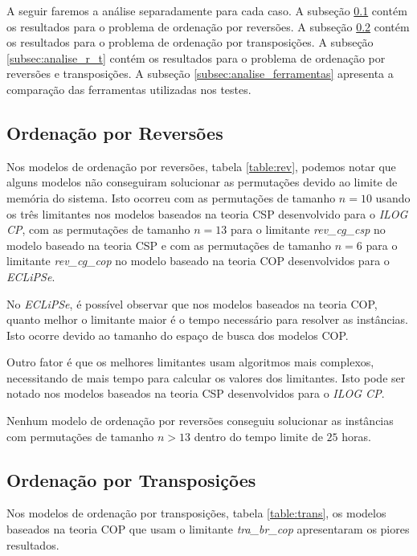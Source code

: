 A seguir faremos a análise separadamente para cada caso. A
subseção \ref{subsec:analise_rev} contém os resultados para o
problema de ordenação por reversões. A
subseção \ref{subsec:analise_tra} contém os resultados para o
problema de ordenação por transposições. A
subseção \ref{subsec:analise_r_t} contém os resultados para o
problema de ordenação por reversões e transposições. A
subseção \ref{subsec:analise_ferramentas} apresenta a comparação das
ferramentas utilizadas nos testes.

\subsection{Ordenação por Reversões}
\label{subsec:analise_rev}
Nos modelos de ordenação por reversões, tabela \ref{table:rev},
podemos notar que alguns modelos não conseguiram solucionar as
permutações devido ao limite de memória do sistema. Isto ocorreu com
as permutações de tamanho $n = 10$ usando os três limitantes nos
modelos baseados na teoria CSP desenvolvido para o \textit{ILOG CP},
com as permutações de tamanho $n = 13$ para o
limitante \textit{rev\_cg\_csp} no modelo baseado na teoria CSP e com
as permutações de tamanho $n = 6$ para o
limitante \textit{rev\_cg\_cop} no modelo baseado na teoria COP
desenvolvidos para o \textit{ECLiPSe}.

No \textit{ECLiPSe}, é possível observar que nos modelos baseados na
teoria COP, quanto melhor o limitante maior é o tempo necessário para
resolver as instâncias. Isto ocorre devido ao tamanho do espaço de
busca dos modelos COP. 

Outro fator é que os melhores limitantes usam algoritmos mais
complexos, necessitando de mais tempo para calcular os valores dos
limitantes. Isto pode ser notado nos modelos baseados na teoria CSP
desenvolvidos para o \textit{ILOG CP}.

Nenhum modelo de ordenação por reversões conseguiu solucionar as
instâncias com permutações de tamanho $n > 13$ dentro do tempo limite
de $25$ horas.



\subsection{Ordenação por Transposições}
\label{subsec:analise_tra}
Nos modelos de ordenação por transposições, tabela \ref{table:trans},
os modelos baseados na teoria COP que usam o
limitante \textit{tra\_br\_cop} apresentaram os piores resultados.

